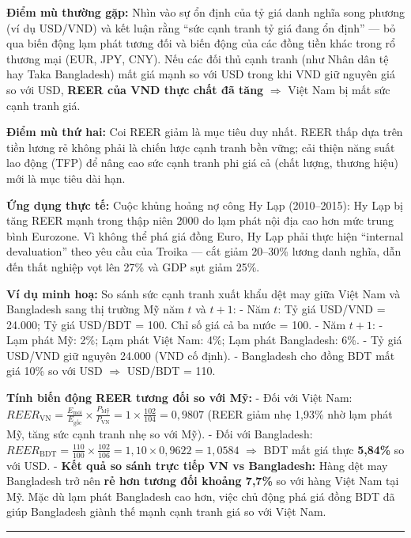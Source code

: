 \documentclass[
]{article}
\begin{document}
\textbf{Điểm mù thường gặp:} Nhìn vào sự ổn định của tỷ giá danh nghĩa
song phương (ví dụ USD/VND) và kết luận rằng ``sức cạnh tranh tỷ giá
đang ổn định'' --- bỏ qua biến động lạm phát tương đối và biến động của
các đồng tiền khác trong rổ thương mại (EUR, JPY, CNY). Nếu các đối thủ
cạnh tranh (như Nhân dân tệ hay Taka Bangladesh) mất giá mạnh so với USD
trong khi VND giữ nguyên giá so với USD, \textbf{REER của VND thực chất
đã tăng} \(\Rightarrow\) Việt Nam bị mất sức cạnh tranh giá.

\textbf{Điểm mù thứ hai:} Coi REER giảm là mục tiêu duy nhất. REER thấp
dựa trên tiền lương rẻ không phải là chiến lược cạnh tranh bền vững; cải
thiện năng suất lao động (TFP) để nâng cao sức cạnh tranh phi giá cả
(chất lượng, thương hiệu) mới là mục tiêu dài hạn.

\textbf{Ứng dụng thực tế:} Cuộc khủng hoảng nợ công Hy Lạp (2010--2015):
Hy Lạp bị tăng REER mạnh trong thập niên 2000 do lạm phát nội địa cao
hơn mức trung bình Eurozone. Vì không thể phá giá đồng Euro, Hy Lạp phải
thực hiện ``internal devaluation'' theo yêu cầu của Troika --- cắt giảm
20--30\% lương danh nghĩa, dẫn đến thất nghiệp vọt lên 27\% và GDP sụt
giảm 25\%.

\textbf{Ví dụ minh hoạ:} So sánh sức cạnh tranh xuất khẩu dệt may giữa
Việt Nam và Bangladesh sang thị trường Mỹ năm \(t\) và \(t+1\): - Năm
\(t\): Tỷ giá USD/VND = 24.000; Tỷ giá USD/BDT = 100. Chỉ số giá cả ba
nước = 100. - Năm \(t+1\): - Lạm phát Mỹ: 2\%; Lạm phát Việt Nam: 4\%;
Lạm phát Bangladesh: 6\%. - Tỷ giá USD/VND giữ nguyên 24.000 (VND cố
định). - Bangladesh cho đồng BDT mất giá 10\% so với USD \(\Rightarrow\)
USD/BDT = 110.

\textbf{Tính biến động REER tương đối so với Mỹ:} - Đối với Việt Nam:
\(REER_{\text{VN}} = \frac{E_{\text{mới}}}{E_{\text{gốc}}} \times \frac{P_{\text{Mỹ}}}{P_{\text{VN}}} = 1 \times \frac{102}{104} = 0{,}9807\)
(REER giảm nhẹ 1,93\% nhờ lạm phát Mỹ, tăng sức cạnh tranh nhẹ so với
Mỹ). - Đối với Bangladesh:
\(REER_{\text{BDT}} = \frac{110}{100} \times \frac{102}{106} = 1{,}10 \times 0{,}9622 = 1{,}0584\)
\(\Rightarrow\) BDT mất giá thực \textbf{5,84\%} so với USD. -
\textbf{Kết quả so sánh trực tiếp VN vs Bangladesh:} Hàng dệt may
Bangladesh trở nên \textbf{rẻ hơn tương đối khoảng 7,7\%} so với hàng
Việt Nam tại Mỹ. Mặc dù lạm phát Bangladesh cao hơn, việc chủ động phá
giá đồng BDT đã giúp Bangladesh giành thế mạnh cạnh tranh giá so với
Việt Nam.

\begin{center}\rule{0.5\linewidth}{0.5pt}\end{center}
\end{document}
